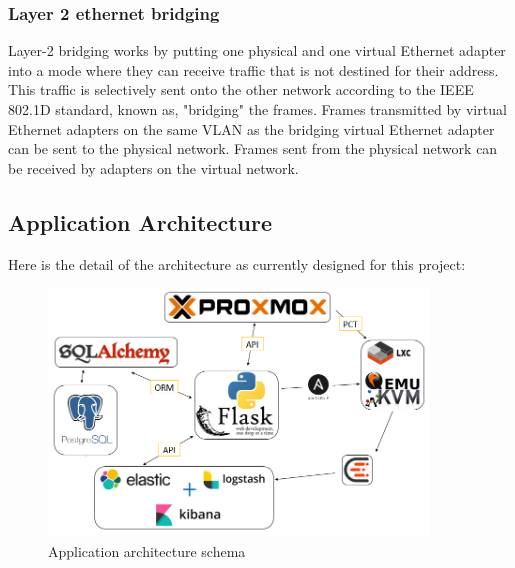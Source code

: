 \vspace{1cm}
\subsubsection{Layer 2 ethernet bridging}

Layer-2 bridging works by putting one physical and one virtual Ethernet adapter into a mode where they can receive traffic that is not destined for their address. This traffic is selectively sent onto the other network according to the IEEE 802.1D standard, known as, "bridging" the frames. Frames transmitted by virtual Ethernet adapters on the same VLAN as the bridging virtual Ethernet adapter can be sent to the physical network. Frames sent from the physical network can be received by adapters on the virtual network.

\pagebreak

\subsection{Application Architecture}

Here is the detail of the architecture as currently designed for this project:
\vspace{1cm}

\begin{figure}[!h]
  \centering
  \includegraphics[width=0.90\textwidth]{images/schema.png}
  \caption{Application architecture schema}
  \label{ArchitectureSchema}
\end{figure}


